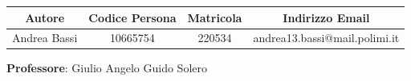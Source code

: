 
\begin{titlepage}

\thispagestyle{empty}
\medskip\medskip\medskip\medskip\medskip\medskip
\vspace{1.8cm}

\begin{table}[H]
    \centering
    \begin{tabular}{c|c|c|c}
        \toprule
        \toprule
        \textbf{Autore}  &  \textbf{Codice Persona} & \textbf{Matricola} & \textbf{Indirizzo Email} \\
        
        \midrule
        \midrule
        Andrea Bassi & 10665754 & 220534 & andrea13.bassi@mail.polimi.it \\
        \bottomrule
        \bottomrule
    \end{tabular}
\end{table}

\vspace{2cm}
\textbf{Professore}: Giulio Angelo Guido Solero
\end{titlepage}
